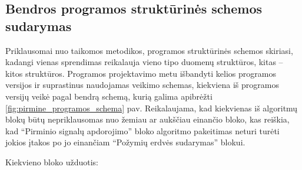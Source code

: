 \documentclass[]{vgtuef}
\begin{document}
\subsection{Bendros programos struktūrinės schemos sudarymas}




Priklausomai nuo taikomos metodikos, programos struktūrinės schemos skiriasi, kadangi vienas sprendimas reikalauja vieno tipo duomenų struktūros, kitas -- kitos struktūros. Programos projektavimo metu išbandyti kelios programos versijos ir suprastinus naudojamas veikimo schemas, kiekviena iš programos versijų veikė pagal bendrą schemą, kurią galima apibrėžti \ref{fig:pirmine_programos_schema} pav. Reikalaujama, kad kiekvienas iš algoritmų blokų būtų nepriklausomas nuo žemiau ar aukščiau einančio bloko, kas reiškia, kad ``Pirminio signalų apdorojimo'' bloko algoritmo pakeitimas neturi turėti jokios įtakos po jo einančiam ``Požymių erdvės sudarymas'' blokui. 

Kiekvieno bloko užduotis:
\end{document}
